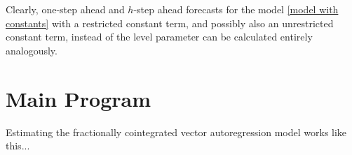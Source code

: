 \documentclass[article]{jss}
\begin{document}
Clearly, one-step ahead and $h$-step ahead forecasts for the model \eqref{model with constants} with a restricted constant term, and possibly also an unrestricted constant term, instead of the level parameter can be calculated entirely analogously.







\section{Main Program} \label{sec:main}


Estimating the fractionally cointegrated vector autoregression model works like this...





%
%
\end{document}
